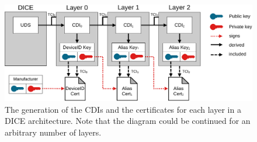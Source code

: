 \begin{figure}[htpb]
  \centering
  \includegraphics[width=1\linewidth]{figures/dice-layers.pdf}
  \caption{The generation of the \acp{CDI} and the certificates for each layer in a \ac{DICE} architecture. Note that the diagram could be continued for an arbitrary number of layers.}\label{fig:dice-layers}
\end{figure}
